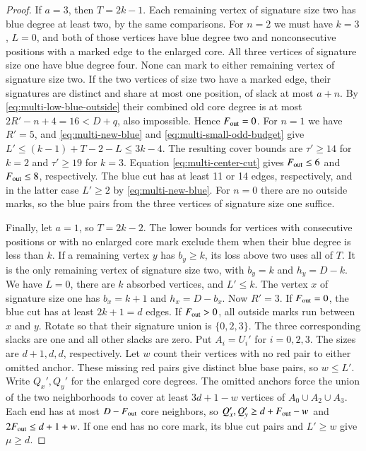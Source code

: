 \documentclass[preprint,11pt,numbers]{elsarticle-arxiv}
\numberwithin{equation}{section}
\theoremstyle{definition}
\begin{document}
\begin{proof}
If $a=3$, then $T=2k-1$. Each remaining vertex of signature
size two has blue degree at least two, by the same comparisons.
For $n=2$ we must have $k=3$, $L=0$, and both of those vertices
have blue degree two and nonconsecutive positions with a marked
edge to the enlarged core. All three vertices of signature size
one have blue degree four. None can mark to either remaining
vertex of signature size two. If the two vertices of size two
have a marked edge, their signatures are distinct and share at
most one position, of slack at most $a+n$. By
\eqref{eq:multi-low-blue-outside} their combined old core degree
is at most $2R'-n+4=16<D+q$, also impossible. Hence $F_{\rm out}=0$.
For $n=1$ we have $R'=5$, and
\eqref{eq:multi-new-blue} and \eqref{eq:multi-small-odd-budget}
give $L'\le(k-1)+T-2-L\le3k-4$. The resulting cover bounds
are $\tau'\ge14$ for $k=2$ and $\tau'\ge19$ for $k=3$.
Equation \eqref{eq:multi-center-cut} gives $F_{\rm out}\le6$ and $F_{\rm out}\le8$,
respectively. The blue cut has at least 11 or 14 edges,
respectively, and in the latter case $L'\ge2$ by
\eqref{eq:multi-new-blue}. For $n=0$ there are no outside marks,
so the blue pairs from the three vertices of signature size
one suffice.

Finally, let $a=1$, so $T=2k-2$. The lower bounds for vertices
with consecutive positions or with no enlarged core mark
exclude them when their blue degree is less than $k$. If a
remaining vertex $y$ has $b_y\ge k$, its loss above two uses
all of $T$. It is the only remaining vertex of signature size
two, with $b_y=k$ and $h_y=D-k$. We have $L=0$, there are $k$
absorbed vertices, and $L'\le k$. The vertex $x$ of signature size
one has $b_x=k+1$ and $h_x=D-b_x$. Now $R'=3$. If $F_{\rm out}=0$, the
blue cut has at least $2k+1=d$ edges. If $F_{\rm out}>0$, all outside
marks run between $x$ and $y$. Rotate so that their signature union
is $\{0,2,3\}$. The three corresponding slacks are one and all
other slacks are zero. Put $A_i=U_i'$ for $i=0,2,3$. The sizes
are $d+1,d,d$, respectively. Let $w$ count their vertices
with no red pair to either omitted anchor. These missing red
pairs give distinct blue base pairs, so $w\le L'$. Write
$Q_x',Q_y'$ for the enlarged core degrees. The omitted anchors
force the union of the two neighborhoods to cover at least
$3d+1-w$ vertices of $A_0\cup A_2\cup A_3$. Each end has at most
$D-F_{\rm out}$ core neighbors, so $Q_x',Q_y'\ge d+F_{\rm out}-w$ and
$2F_{\rm out}\le d+1+w$. If one end has no core mark, its blue cut pairs
and $L'\ge w$ give $\mu\ge d$.


\end{proof}
\end{document}
